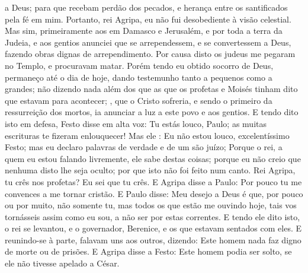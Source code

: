 {{} a Deus; para que recebam perdão dos pecados, e herança entre os santificados pela fé em mim.
  Portanto, rei Agripa, eu não fui desobediente à visão celestial.
  Mas sim, primeiramente aos
{} em Damasco e Jerusalém, e por toda a terra da Judeia, e aos gentios anunciei que se arrependessem, e se convertessem a Deus, fazendo obras dignas de arrependimento.
  Por causa disto os judeus me pegaram no Templo, e procuravam
{} matar.
  Porém tendo eu obtido socorro de Deus, permaneço até o dia de hoje, dando testemunho tanto a pequenos como a grandes; não dizendo nada além dos que as
{} que os profetas e Moisés tinham dito que estavam para acontecer;
  ,  que o Cristo sofreria, e sendo o primeiro da ressurreição dos mortos, ia anunciar a luz a este povo e aos gentios.
  E tendo
{} dito isto em
{} defesa, Festo disse em alta voz: Tu estás louco, Paulo; as muitas escrituras te fizeram enlouquecer!
  Mas ele
{} : Eu não estou louco, excelentíssimo Festo; mas eu declaro palavras de verdade e de um são juízo;
  Porque o rei, a quem eu estou falando livremente, ele sabe
{} destas coisas; porque eu não creio que nenhuma disto lhe seja oculto; por que isto não foi feito num canto.
  Rei Agripa, tu crês nos profetas? Eu sei que tu crês.
  E Agripa disse a Paulo: Por pouco tu me convences a me tornar cristão.
  E Paulo disse: Meu desejo a Deus é que, por pouco ou por muito, não somente tu, mas todos os que estão me ouvindo hoje, tais vos tornásseis assim como eu sou, a não ser por estas correntes.
  E tendo ele dito isto, o rei se levantou, e
{} o governador, Berenice, e os que estavam sentados com eles.
  E reunindo-se à parte, falavam uns aos outros, dizendo: Este homem nada faz
{} digno de morte ou de prisões.
  E Agripa disse a Festo: Este homem podia ser solto, se ele não tivesse apelado a César.
\par }

